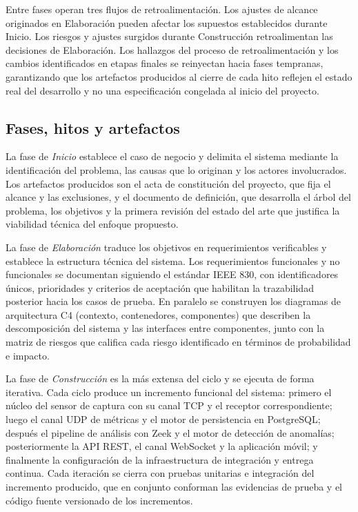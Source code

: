 Entre fases operan tres flujos de retroalimentación. Los ajustes de 
alcance originados en Elaboración pueden afectar los supuestos 
establecidos durante Inicio. Los riesgos y ajustes surgidos durante 
Construcción retroalimentan las decisiones de Elaboración. Los 
hallazgos del proceso de retroalimentación y los cambios identificados 
en etapas finales se reinyectan hacia fases tempranas, garantizando 
que los artefactos producidos al cierre de cada hito reflejen el 
estado real del desarrollo y no una especificación congelada al 
inicio del proyecto.

\subsection{Fases, hitos y artefactos}

La fase de \textit{Inicio} establece el caso de negocio y delimita el 
sistema mediante la identificación del problema, las causas que lo 
originan y los actores involucrados. Los artefactos producidos son el 
acta de constitución del proyecto, que fija el alcance y las 
exclusiones, y el documento de definición, que desarrolla el árbol 
del problema, los objetivos y la primera revisión del estado del arte 
que justifica la viabilidad técnica del enfoque propuesto.

La fase de \textit{Elaboración} traduce los objetivos en 
requerimientos verificables y establece la estructura técnica del 
sistema. Los requerimientos funcionales y no funcionales se 
documentan siguiendo el estándar IEEE 830, con identificadores 
únicos, prioridades y criterios de aceptación que habilitan la 
trazabilidad posterior hacia los casos de prueba. En paralelo se 
construyen los diagramas de arquitectura C4 (contexto, contenedores, 
componentes) que describen la descomposición del sistema y las 
interfaces entre componentes, junto con la matriz de riesgos que 
califica cada riesgo identificado en términos de probabilidad e 
impacto.

La fase de \textit{Construcción} es la más extensa del ciclo y se 
ejecuta de forma iterativa. Cada ciclo produce un incremento 
funcional del sistema: primero el núcleo del sensor de captura con 
su canal TCP y el receptor correspondiente; luego el canal UDP de 
métricas y el motor de persistencia en PostgreSQL; después el 
pipeline de análisis con Zeek y el motor de detección de anomalías; 
posteriormente la API REST, el canal WebSocket y la aplicación móvil; 
y finalmente la configuración de la infraestructura de integración y 
entrega continua. Cada iteración se cierra con pruebas unitarias e 
integración del incremento producido, que en conjunto conforman las 
evidencias de prueba y el código fuente versionado de los 
incrementos.

